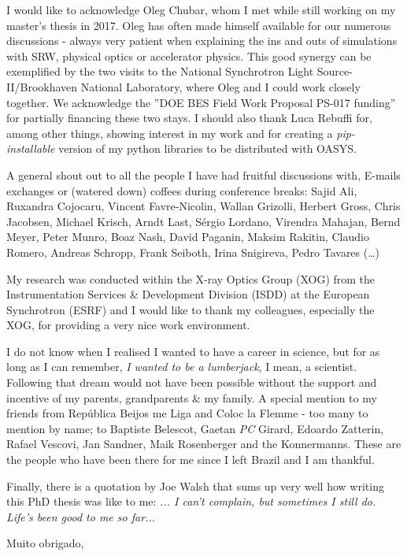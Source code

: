 I would like to acknowledge Oleg Chubar, whom I met while still working on my master's thesis in 2017. Oleg has often made himself available for our numerous discussions - always very patient when explaining the ins and outs of simulations with SRW, physical optics or accelerator physics. This good synergy can be exemplified by the two visits to the National Synchrotron Light Source-II/Brookhaven National Laboratory, where Oleg and I could work closely together. We acknowledge the ”DOE BES Field Work Proposal PS-017 funding” for partially financing these two stays. I should also thank Luca Rebuffi for, among other things, showing interest in my work and for creating a \textit{pip-installable} version of my python libraries to be distributed with OASYS.

A general shout out to all the people I have had fruitful discussions with, E-mails exchanges or (watered down) coffees during conference breaks: Sajid Ali, Ruxandra Cojocaru, Vincent Favre-Nicolin, Wallan Grizolli, Herbert Gross, Chris Jacobsen, Michael Krisch, Arndt Last, S\'ergio Lordano, Virendra Mahajan, Bernd Meyer, Peter Munro, Boaz Nash, David Paganin, Maksim Rakitin, Claudio Romero, Andreas Schropp, Frank Seiboth, Irina Snigireva, Pedro Tavares (…)

My research was conducted within the X-ray Optics Group (XOG) from the Instrumentation Services \& Development Division (ISDD) at the European Synchrotron (ESRF) and I would like to thank my colleagues, especially the XOG, for providing a very nice work environment. 

I do not know when I realised I wanted to have a career in science, but for as long as I can remember, \textit{I wanted to be a lumberjack}, I mean, a scientist. Following that dream would not have been possible without the support and incentive of my parents, grandparents \& my family. A special mention to my friends from Rep\'ublica Beijos me Liga and Coloc la Flemme - too many to mention by name; to Baptiste Belescot, Gaetan \textit{PC} Girard, Edoardo Zatterin, Rafael Vescovi, Jan Sandner, Maik Rosenberger and the Konnermanns. These are the people who have been there for me since I left Brazil and I am thankful.

Finally, there is a quotation by Joe Walsh that sums up very well how writing this PhD thesis was like to me: \textit{... I can't complain, but sometimes I still do. Life's been good to me so far...}

\begin{flushright}
	\begin{minipage}{5cm}
	    \centering Muito obrigado,\\
		\centering\thesisName
	\end{minipage}
\end{flushright}